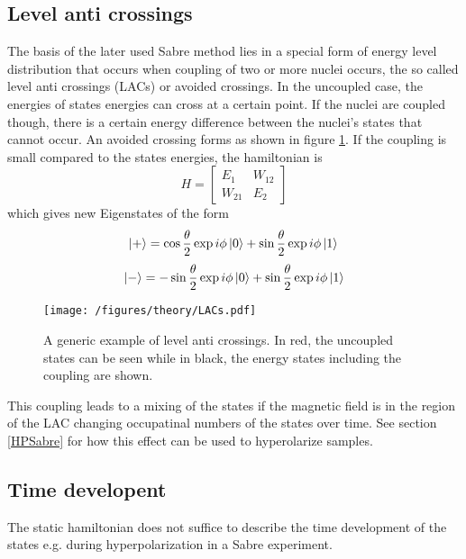         \subsection{Level anti crossings}
        The basis of the later used Sabre method lies in a special form of energy level distribution that occurs when coupling of two or more nuclei occurs, the so called level anti crossings (LACs) or avoided crossings. In the uncoupled case, the energies of states energies can cross at a certain point. If the nuclei are coupled though, there is a certain energy difference between the nuclei's states that cannot occur. An avoided crossing forms as shown in figure \ref{figure:theory:LAC}. If the coupling is small compared to the states energies, the hamiltonian is 
        \begin{equation}
            H = \left [
                \begin{array}{ll}
                    E_{1} & W_{12}\\
                    W_{21} & E_2
                \end{array}
            \right ]
        \end{equation} 
        which gives new Eigenstates of the form
        \begin{equation*}
            \ket{+} = \cos\frac{{\theta}}{2}\exp{i\phi}\ket{0} + \sin{\frac{\theta}{2}}\exp{i\phi}\ket{1}\\
        \end{equation*}
        \begin{equation*}
            \ket{-} = -\sin{\frac{\theta}{2}}\exp{i\phi}\ket{0} + \sin{\frac{\theta}{2}}\exp{i\phi}\ket{1}
        \end{equation*}
            \begin{figure}
                \centering
                \texttt{[image: /figures/theory/LACs.pdf]}
                \caption[Leval anti crossings]{A generic example of level anti crossings. In red, the uncoupled states can be seen while in black, the energy states including the coupling are shown.}
                \label{figure:theory:LAC}
            \end{figure}
            This coupling leads to a mixing of the states if the magnetic field is in the region of the LAC changing occupatinal numbers of the states over time. See section \ref{HPSabre} for how this effect can be used to hyperolarize samples.
            \subsection{Time developent}
            The static hamiltonian does not suffice to describe the time development of the states e.g. during hyperpolarization in a Sabre experiment.
